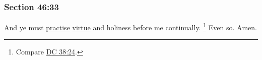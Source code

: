 	\subsubsection{Section 46:33} %
		\label{DC46-33}

		And ye must \hyperref[PRACTICE]{practise} \hyperref[VIRTUE]{virtue} and holiness before me continually.%
			\footnote{%
				Compare \hyperref[DC38-24]{DC 38:24}.
				}
		Even so.  Amen.

